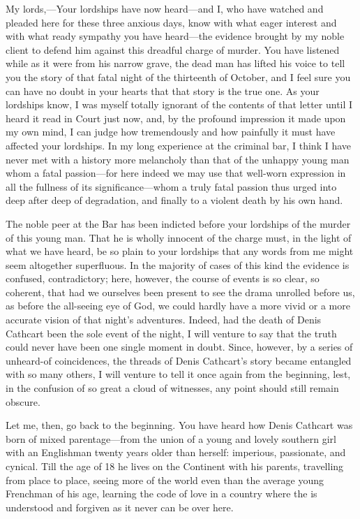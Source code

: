 \begin{dialogue}
	
 My lords,—Your lordships have now heard—and I, who have watched and pleaded here for these three anxious days, know with what eager interest and with what ready sympathy you have heard—the evidence brought by my noble client to defend him against this dreadful charge of murder. You have listened while as it were from his narrow grave, the dead man has lifted his voice to tell you the story of that fatal night of the thirteenth of October, and I feel sure you can have no doubt in your hearts that that story is the true one. As your lordships know, I was myself totally ignorant of the contents of that letter until I heard it read in Court just now, and, by the profound impression it made upon my own mind, I can judge how tremendously and how painfully it must have affected your lordships. In my long experience at the criminal bar, I think I have never met with a history more melancholy than that of the unhappy young man whom a fatal passion—for here indeed we may use that well-worn expression in all the fullness of its significance—whom a truly fatal passion thus urged into deep after deep of degradation, and finally to a violent death by his own hand.

The noble peer at the Bar has been indicted before your lordships of the murder of this young man. That he is wholly innocent of the charge must, in the light of what we have heard, be so plain to your lordships that any words from me might seem altogether superfluous. In the majority of cases of this kind the evidence is confused, contradictory; here, however, the course of events is so clear, so coherent, that had we ourselves been present to see the drama unrolled before us, as before the all-seeing eye of God, we could hardly have a more vivid or a more accurate vision of that night's adventures. Indeed, had the death of Denis Cathcart been the sole event of the night, I will venture to say that the truth could never have been one single moment in doubt. Since, however, by a series of unheard-of coincidences, the threads of Denis Cathcart's story became entangled with so many others, I will venture to tell it once again from the beginning, lest, in the confusion of so great a cloud of witnesses, any point should still remain obscure.

Let me, then, go back to the beginning. You have heard how Denis Cathcart was born of mixed parentage—from the union of a young and lovely southern girl with an Englishman twenty years older than herself: imperious, passionate, and cynical. Till the age of 18 he lives on the Continent with his parents, travelling from place to place, seeing more of the world even than the average young Frenchman of his age, learning the code of love in a country where the  is understood and forgiven as it never can be over here.


\end{dialogue}
